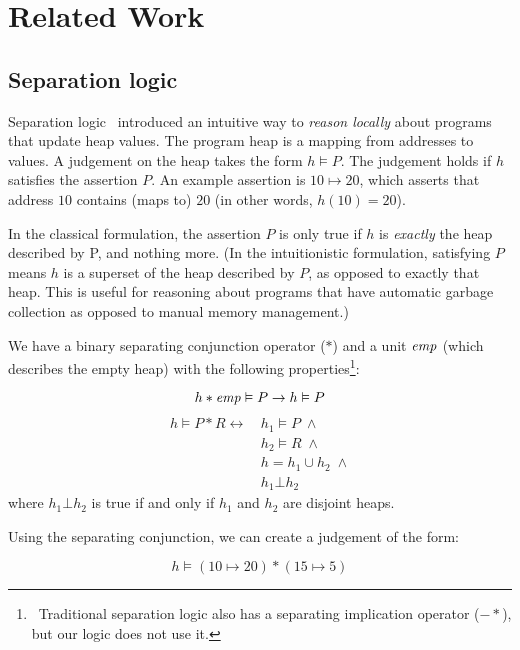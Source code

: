 \section{Related Work}
\label{sec:relwork}

\subsection{Separation logic}
Separation logic~\cite{reynolds2002separation} introduced an intuitive way to
\textit{reason locally} about programs that update heap values.
The program heap is a
mapping from addresses to values.
A judgement on the heap takes the form
$h \vDash P$.
The judgement holds if $h$ satisfies the assertion $P$.
An
example assertion is $10 \mapsto 20$, which asserts that address $10$ contains
(maps to) $20$ (in other words, $h(10) = 20$).

In the classical formulation,
the
assertion $P$ is only true if $h$ is \textit{exactly} the heap described by P,
and nothing more.
(In the intuitionistic formulation,
satisfying $P$ means $h$ is a superset of the heap described by $P$, as opposed
to exactly that heap.
This is useful for reasoning about programs that have
automatic garbage collection as opposed to manual memory management.)

We have a binary separating conjunction operator ($\ast$) and
a unit $\mathit{emp}$ (which describes the empty heap) with the following
properties\footnote{\
Traditional separation logic also has a separating implication operator
($-\!\!\ast$),
but our logic does not use it.}:

\[
    h \ast \mathit{emp} \vDash P \rightarrow h \vDash P \\
\]
\begin{align*}
    h \vDash P \ast R \leftrightarrow \, &h_1 \vDash P \; \wedge \\
		           &h_2 \vDash R \; \wedge \\
		           &h = h_1 \cup h_2 \; \wedge \\
			   &h_1 \bot h_2
\end{align*}
where $h_1 \bot h_2$ is true if and only if $h_1$ and $h_2$ are
disjoint heaps.


Using the separating conjunction, we can create a judgement of the form:

\[ h \vDash (10\mapsto20) * (15\mapsto5) \]

